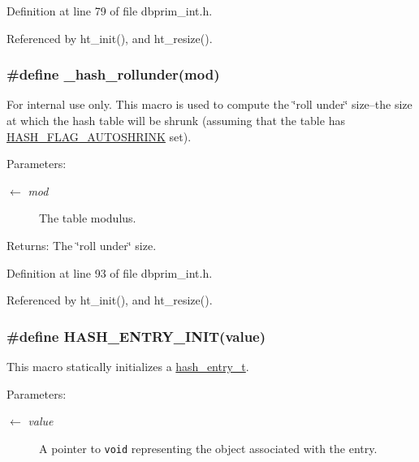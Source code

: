 Definition at line 79 of file dbprim\_\-int.h.

Referenced by ht\_\-init(), and ht\_\-resize().\hypertarget{group__dbprim__hash_ga48}{
\subsubsection[\_\-hash\_\-rollunder]{\setlength{\rightskip}{0pt plus 5cm}\#define \_\-hash\_\-rollunder(mod)}}
\label{group__dbprim__hash_ga48}


\begin{Desc}
\item[For internal use only.]
This macro is used to compute the \char`\"{}roll under\char`\"{} size--the size at which the hash table will be shrunk (assuming that the table has \hyperlink{group__dbprim__hash_ga24}{HASH\_\-FLAG\_\-AUTOSHRINK} set).

\begin{Desc}
\item[Parameters:]
\begin{description}
\item[\mbox{$\leftarrow$} {\em mod}]The table modulus.\end{description}
\end{Desc}
\begin{Desc}
\item[Returns:]The \char`\"{}roll under\char`\"{} size.\end{Desc}
\end{Desc}


Definition at line 93 of file dbprim\_\-int.h.

Referenced by ht\_\-init(), and ht\_\-resize().\hypertarget{group__dbprim__hash_ga38}{
\subsubsection[HASH\_\-ENTRY\_\-INIT]{\setlength{\rightskip}{0pt plus 5cm}\#define HASH\_\-ENTRY\_\-INIT(value)}}
\label{group__dbprim__hash_ga38}


This macro statically initializes a \hyperlink{group__dbprim__hash_ga2}{hash\_\-entry\_\-t}.

\begin{Desc}
\item[Parameters:]
\begin{description}
\item[\mbox{$\leftarrow$} {\em value}]A pointer to {\tt void} representing the object associated with the entry.\end{description}
\end{Desc}


